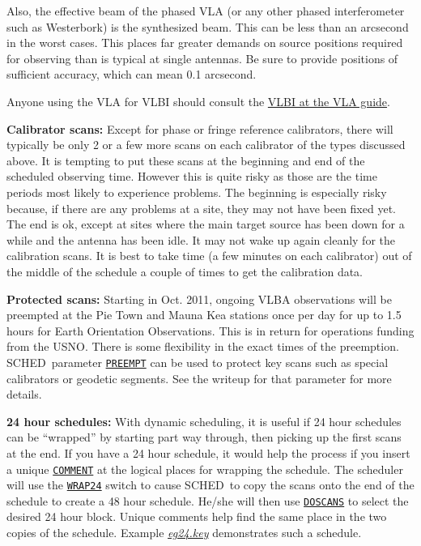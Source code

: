 \documentclass{report}
\newcommand{\schedb}{{\sc SCHED~}}
\begin{document}
\begin{list}{}{\parsep .5em  \itemsep .5em }
Also, the effective beam of the phased VLA (or any other phased
interferometer such as Westerbork) is the synthesized beam.  This
can be less than an arcsecond in the worst cases.  This places far
greater demands on source positions required for observing than
is typical at single antennas.  Be sure to provide positions
of sufficient accuracy, which can mean 0.1 arcsecond.

Anyone using the VLA for VLBI should consult the
{\href{http://www.vla.nrao.edu/astro/guides/vlbivla/current/}{VLBI at the VLA guide}}.

\item{\bf Calibrator scans:} Except for phase or fringe reference
calibrators, there will typically be only 2 or a few more scans on
each calibrator of the types discussed above.  It is tempting to put
these scans at the beginning and end of the scheduled observing time.
However this is quite risky as those are the time periods most likely
to experience problems.  The beginning is especially risky because, if
there are any problems at a site, they may not have been fixed yet.
The end is ok, except at sites where the main target source has been
down for a while and the antenna has been idle.  It may not wake up
again cleanly for the calibration scans.  It is best to take time (a
few minutes on each calibrator) out of the middle of the schedule a
couple of times to get the calibration data.

\item{\bf Protected scans:} Starting in Oct. 2011, ongoing VLBA
observations will be preempted at the Pie Town and Mauna Kea stations
once per day for up to 1.5 hours for Earth Orientation Observations.
This is in return for operations funding from the USNO.  There is some
flexibility in the exact times of the preemption. \schedb parameter
{\hyperref[MP:PREEMPT]{{\tt PREEMPT}}} can be used to protect key scans such
as special calibrators or geodetic segments.  See the writeup for that
parameter for more details.

\item{\bf 24 hour schedules:} With dynamic scheduling, it is useful if
24 hour schedules can be ``wrapped'' by starting part way through,
then picking up the first scans at the end.  If you have a 24 hour
schedule, it would help the process if you insert a unique
{\hyperref[MP:COMMENT]{{\tt COMMENT}}} at the logical places for wrapping
the schedule.  The scheduler will use the 
{\hyperref[MP:WRAP24]{{\tt WRAP24}}}
switch to cause \schedb to copy the scans onto the
end of the schedule to create a 48 hour schedule.  He/she will then
use 
{\hyperref[MP:COMMENT]{{\tt DOSCANS}}} to select the desired 24 hour
block.  Unique comments help find the same place in the two copies of
the schedule.  Example 
{\href{examples/eg24.key}{{\sl eg24.key}}}
demonstrates such a schedule.


\end{list}
\end{document}
